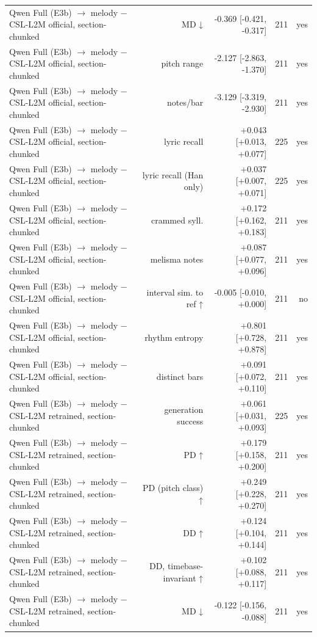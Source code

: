 \begin{table}[t]
\begin{tabular}{lrrrr}
Qwen Full (E3b) $\rightarrow$ melody $-$ CSL-L2M official, section-chunked & MD ↓ & -0.369 [-0.421, -0.317] & 211 & yes \\
Qwen Full (E3b) $\rightarrow$ melody $-$ CSL-L2M official, section-chunked & pitch range & -2.127 [-2.863, -1.370] & 211 & yes \\
Qwen Full (E3b) $\rightarrow$ melody $-$ CSL-L2M official, section-chunked & notes/bar & -3.129 [-3.319, -2.930] & 211 & yes \\
Qwen Full (E3b) $\rightarrow$ melody $-$ CSL-L2M official, section-chunked & lyric recall & +0.043 [+0.013, +0.077] & 225 & yes \\
Qwen Full (E3b) $\rightarrow$ melody $-$ CSL-L2M official, section-chunked & lyric recall (Han only) & +0.037 [+0.007, +0.071] & 225 & yes \\
Qwen Full (E3b) $\rightarrow$ melody $-$ CSL-L2M official, section-chunked & crammed syll. & +0.172 [+0.162, +0.183] & 211 & yes \\
Qwen Full (E3b) $\rightarrow$ melody $-$ CSL-L2M official, section-chunked & melisma notes & +0.087 [+0.077, +0.096] & 211 & yes \\
Qwen Full (E3b) $\rightarrow$ melody $-$ CSL-L2M official, section-chunked & interval sim. to ref ↑ & -0.005 [-0.010, +0.000] & 211 & no \\
Qwen Full (E3b) $\rightarrow$ melody $-$ CSL-L2M official, section-chunked & rhythm entropy & +0.801 [+0.728, +0.878] & 211 & yes \\
Qwen Full (E3b) $\rightarrow$ melody $-$ CSL-L2M official, section-chunked & distinct bars & +0.091 [+0.072, +0.110] & 211 & yes \\
Qwen Full (E3b) $\rightarrow$ melody $-$ CSL-L2M retrained, section-chunked & generation success & +0.061 [+0.031, +0.093] & 225 & yes \\
Qwen Full (E3b) $\rightarrow$ melody $-$ CSL-L2M retrained, section-chunked & PD ↑ & +0.179 [+0.158, +0.200] & 211 & yes \\
Qwen Full (E3b) $\rightarrow$ melody $-$ CSL-L2M retrained, section-chunked & PD (pitch class) ↑ & +0.249 [+0.228, +0.270] & 211 & yes \\
Qwen Full (E3b) $\rightarrow$ melody $-$ CSL-L2M retrained, section-chunked & DD ↑ & +0.124 [+0.104, +0.144] & 211 & yes \\
Qwen Full (E3b) $\rightarrow$ melody $-$ CSL-L2M retrained, section-chunked & DD, timebase-invariant ↑ & +0.102 [+0.088, +0.117] & 211 & yes \\
Qwen Full (E3b) $\rightarrow$ melody $-$ CSL-L2M retrained, section-chunked & MD ↓ & -0.122 [-0.156, -0.088] & 211 & yes \\

\end{tabular}
\end{table}
